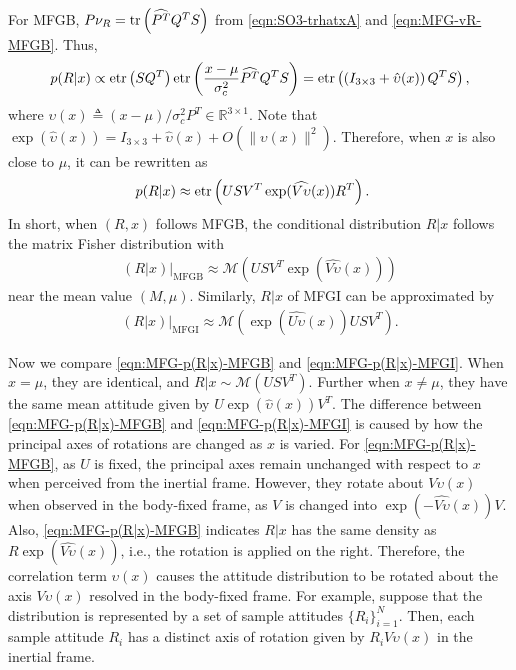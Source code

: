 For MFGB, $P\nu_R = \mathrm{tr}\left( \widehat{P^T} Q^TS \right)$ from \eqref{eqn:SO3-trhatxA} and \eqref{eqn:MFG-vR-MFGB}.
Thus,
\begin{align*} 
	p(R|x) \propto \mathrm{etr}\left( SQ^T \right) \mathrm{etr}\left( \frac{x-\mu}{\sigma_c^2} \widehat{P^T} Q^TS \right) = \mathrm{etr}\left( \left(I_{3\times 3} + \hat{\upsilon}(x)\right) Q^TS \right),
\end{align*}
where $\upsilon(x) \triangleq (x-\mu)/\sigma_c^2 P^T \in \mathbb{R}^{3\times 1}$.
Note that $\exp(\hat\upsilon(x))=I_{3\times 3} + \hat\upsilon(x) + O(\|\upsilon(x)\|^2)$.
Therefore, when $x$ is also close to $\mu$, it can be rewritten as
\begin{align*}
	p(R|x) &\approx \mathrm{etr}\left( USV^T\exp(\widehat{V\upsilon}(x))R^T \right).
\end{align*}
In short, when $(R,x)$ follows MFGB, the conditional distribution $R|x$ follows the matrix Fisher distribution with
\begin{align} \label{eqn:MFG-p(R|x)-MFGB}
	(R|x)\big|_{\text{MFGB}} \approx \mathcal{M}(USV^T\exp(\widehat{V\upsilon}(x))) 
\end{align}
near the mean value $(M,\mu)$. 
Similarly, $R|x$ of MFGI can be approximated by
\begin{align} \label{eqn:MFG-p(R|x)-MFGI}
	(R|x)\big|_\text{MFGI} \approx \mathcal{M}(\exp(\widehat{U\upsilon}(x))USV^T).
\end{align}

Now we compare \eqref{eqn:MFG-p(R|x)-MFGB} and \eqref{eqn:MFG-p(R|x)-MFGI}.
When $x=\mu$, they are identical, and $R|x \sim \mathcal{M}(USV^T)$. 
Further when $x\neq \mu$, they have the same mean attitude given by $U\exp(\hat{\upsilon}(x))V^T$.
The difference between \eqref{eqn:MFG-p(R|x)-MFGB} and \eqref{eqn:MFG-p(R|x)-MFGI} is caused by how the principal axes of rotations are changed as $x$ is varied. 
For \eqref{eqn:MFG-p(R|x)-MFGB}, as $U$ is fixed, the principal axes remain unchanged with respect to $x$ when perceived from the inertial frame.
However, they rotate about $V\upsilon(x)$ when observed in the body-fixed frame, as $V$ is changed into $\exp(-\widehat{V\upsilon}(x))V$.
Also, \eqref{eqn:MFG-p(R|x)-MFGB} indicates $R|x$ has the same density as $R\exp(\widehat{V\upsilon}(x))$, i.e., the rotation is applied on the right.
Therefore, the correlation term $\upsilon(x)$ causes the attitude distribution to be rotated about the axis $V\upsilon(x)$ resolved in the body-fixed frame.
For example, suppose that the distribution is represented by a set of sample attitudes $\{R_i\}_{i=1}^N$. 
Then, each sample attitude $R_i$ has a distinct axis of rotation given by $R_i V\upsilon(x)$ in the inertial frame.

